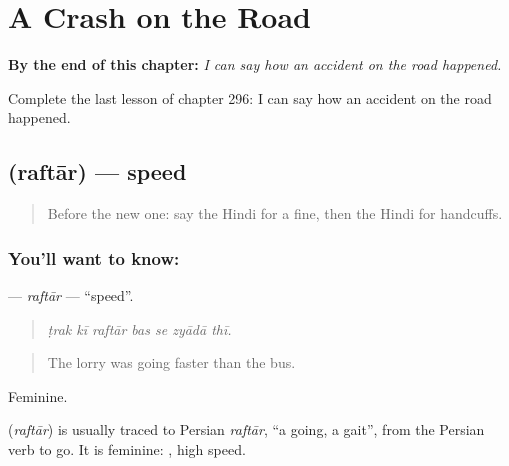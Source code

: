 
\chapter{A Crash on the Road}
\label{ch:hi-a-crash-on-the-road}

\begin{chapteropening}
\textbf{By the end of this chapter:} \emph{I can say how an accident on the road happened.}

Complete the last lesson of chapter 296: I can say how an accident on the road happened.
\end{chapteropening}

\section[\texorpdfstring{\hi{रफ़्तार} (raftār)}{रफ़्तार (raftār)}]{ (raftār) — speed}

\label{lesson:HI-C296-raftar}



\begin{quote}
Before the new one: say the Hindi for a fine, then the Hindi for handcuffs.
\end{quote}

\subsection*{You'll want to know: }
\textbf{} — \emph{raftār} — \textquotedblleft{}speed\textquotedblright{}.

\begin{quote}
      
\end{quote}

\begin{quote}
\emph{ṭrak kī raftār bas se zyādā thī.}
\end{quote}

\begin{quote}
The lorry was going faster than the bus.
\end{quote}

Feminine.

\begin{cousinweb}
\textbf{} (\emph{raftār}) is usually traced to Persian \emph{raftār}, \textquotedblleft{}a going, a gait\textquotedblright{}, from the Persian verb to go. It is feminine: \textbf{ }, high speed.
\end{cousinweb}

